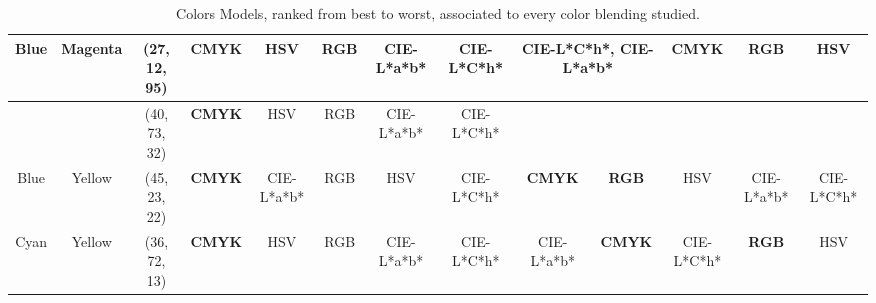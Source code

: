 \begin{table}[htbp]
{\begin{tabular}{@{}ccclcccccccccc@{}}
    Blue                    & \multicolumn{1}{c|}{Magenta}                   & \multicolumn{2}{c|}{\cellcolor[HTML]{8000FF}(27, 12, 95)}  & \multicolumn{1}{c|}{\textbf{CMYK}}                         & \multicolumn{1}{c|}{HSV}           & \multicolumn{1}{c|}{RGB}        & \multicolumn{1}{c|}{CIE-L*a*b*} & \multicolumn{1}{c|}{CIE-L*C*h*} & \multicolumn{2}{c|}{CIE-L*C*h*, CIE-L*a*b*}                                                                 & \multicolumn{1}{c|}{\textbf{CMYK}}                & \multicolumn{1}{c|}{\textbf{RGB}}                 & \multicolumn{1}{c|}{HSV}                          \\ \midrule
                            & \multicolumn{1}{c|}{}                          & \multicolumn{2}{c|}{\cellcolor[HTML]{00FF80}(40, 73, 32)}  & \multicolumn{1}{c|}{\textbf{CMYK}}                         & \multicolumn{1}{c|}{HSV}           & \multicolumn{1}{c|}{RGB}        & \multicolumn{1}{c|}{CIE-L*a*b*} & \multicolumn{1}{c|}{CIE-L*C*h*} & \multicolumn{1}{c|}{}                                & \multicolumn{1}{c|}{}                                & \multicolumn{1}{c|}{}                             & \multicolumn{1}{c|}{}                             & \multicolumn{1}{c|}{}                             \\ \cmidrule(lr){3-9}
    \multirow{-2}{*}{Blue}  & \multicolumn{1}{c|}{\multirow{-2}{*}{Yellow}}  & \multicolumn{2}{c|}{\cellcolor[HTML]{FF007F}(45, 23, 22)}  & \multicolumn{1}{c|}{\textbf{CMYK}}                         & \multicolumn{1}{c|}{CIE-L*a*b*}    & \multicolumn{1}{c|}{RGB}        & \multicolumn{1}{c|}{HSV}        & \multicolumn{1}{c|}{CIE-L*C*h*} & \multicolumn{1}{c|}{\multirow{-2}{*}{\textbf{CMYK}}} & \multicolumn{1}{c|}{\multirow{-2}{*}{\textbf{RGB}}}  & \multicolumn{1}{c|}{\multirow{-2}{*}{HSV}}        & \multicolumn{1}{c|}{\multirow{-2}{*}{CIE-L*a*b*}} & \multicolumn{1}{c|}{\multirow{-2}{*}{CIE-L*C*h*}} \\ \midrule
    Cyan                    & \multicolumn{1}{c|}{Yellow}                    & \multicolumn{2}{c|}{\cellcolor[HTML]{00FF00}(36, 72, 13)}  & \multicolumn{1}{c|}{\textbf{CMYK}}                         & \multicolumn{1}{c|}{HSV}           & \multicolumn{1}{c|}{RGB}        & \multicolumn{1}{c|}{CIE-L*a*b*} & \multicolumn{1}{c|}{CIE-L*C*h*} & \multicolumn{1}{c|}{CIE-L*a*b*}                      & \multicolumn{1}{c|}{\textbf{CMYK}}                   & \multicolumn{1}{c|}{CIE-L*C*h*}                   & \multicolumn{1}{c|}{\textbf{RGB}}                 & \multicolumn{1}{c|}{HSV}                          \\ \bottomrule
  \end{tabular}}
  \caption[Colors Models, ranked from best to worst, associated to every color blending studied.]{Colors Models, ranked from best to worst, associated to every color blending studied.}
  \vspace{-5pt}
  \label{table:blendings_models_rank}
\end{table}
%
